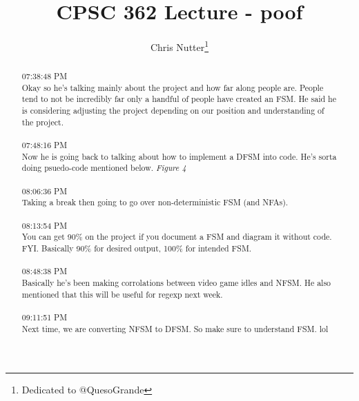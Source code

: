\documentclass[12pt,a4paper]{article}
\title{CPSC 362 Lecture - poof}
\author{Chris Nutter\thanks{Dedicated to @QuesoGrande}}
\begin{document}
\maketitle

\begin{abstract}
    {07:38:48 PM}\\
    Okay so he's talking mainly about the project and how far along people are. 
    People tend to not be incredibly far only a handful of people have created an FSM. 
    He said he is considering adjusting the project depending on our 
    position and understanding of the project.
        \\\\
    07:48:16 PM\\
    Now he is going back to talking about how to implement a DFSM into code. 
    He's sorta doing psuedo-code mentioned below. \emph{Figure 4}
        \\\\
    08:06:36 PM\\
    Taking a break then going to go over non-deterministic FSM (and NFAs).
        \\\\
    08:13:54 PM\\
    You can get 90\% on the project if you document a FSM and diagram it without code. FYI. 
    Basically 90\% for desired output, 100\% for intended FSM.
        \\\\
    08:48:38 PM\\
    Basically he's been making corrolations between video game idles and NFSM. He also mentioned 
    that this will be useful for regexp next week.
        \\\\
    09:11:51 PM\\
    Next time, we are converting NFSM to DFSM. So make sure to understand FSM. lol
\end{abstract}    

\clearpage
\tableofcontents
\clearpage
\end{document}
